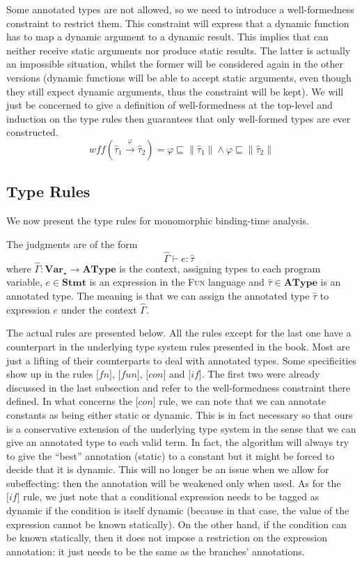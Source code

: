 \documentclass[a4wide,12pt]{article}
\theoremstyle{definition}
\theoremstyle{plain}
\theoremstyle{remark}
\def\Stmt {\mathbf{Stmt}}
\def\Var {\mathbf{Var}}
\def\AType{\mathbf{AType}}
\def\sqleq{\sqsubseteq}
\def\htau{\hat{\tau}}
\def\HGamma{\hat{\Gamma}}
\def\judge#1#2#3{#1 \vdash #2 : #3\;\;}
\def\annot#1{\|#1\|}
\begin{document}
Some annotated types are not allowed, so we need to introduce a well-formedness
constraint to restrict them. This constraint will express that a dynamic function
has to map a dynamic argument to a dynamic result. This implies that
can neither receive static arguments nor produce static results. The latter is actually
an impossible situation, whilst the former will be considered again in the other versions
(dynamic functions will be able to accept static arguments, even though they still expect dynamic arguments,
thus the constraint will be kept).
We will just be concerned to give a definition of well-formedness at the top-level and
induction on the type rules then guarantees that only
well-formed types are ever constructed.
\[
wff(\htau_1 \overset{\varphi}{\to} \htau_2) 
= \varphi \sqleq \annot{\htau_1}
 \land   \varphi \sqleq \annot{\htau_2}
\]

\subsection{Type Rules}

We now present the type rules for monomorphic binding-time analysis.

The judgments are of the form
\[\judge{\HGamma}{e}{\htau}\]
where $\HGamma: \Var_\star \to \AType$ is the context, assigning types to each program variable, 
$e \in \Stmt$ is an expression in the \textsc{Fun} language and $\htau \in \AType$ is an annotated type.
The meaning is that we can assign the annotated type $\htau$ to expression $e$ under the context $\HGamma$. 


The actual rules are presented below. All the rules except for the last one
have a counterpart in the underlying type system rules presented in the book.
Most are just a lifting of their counterparts to deal with annotated types.
Some specificities show up in the rules
$\lbrack fn \rbrack$,
$\lbrack fun \rbrack$,
$\lbrack con \rbrack$ and
$\lbrack if \rbrack$. 
The first two were already discussed in the last subsection and refer to 
the well-formedness constraint there defined.
In what concerns the $\lbrack con \rbrack$ rule, we can note that we can annotate constants 
as being either static or dynamic. This is in fact necessary so that ours
is a conservative extension of the underlying type system in the sense that 
we can give an annotated type to each valid term. In fact, the algorithm will always try to give the
``best'' annotation (static) to a constant but it might be forced to decide that it is dynamic. 
This will no longer be an issue when we allow for subeffecting: then the annotation will be weakened
only when used. As for the $\lbrack if \rbrack$ rule, we just note that a conditional expression
needs to be tagged as dynamic if the condition is itself dynamic (because in that case,
the value of the expression cannot be known statically). On the other hand, if the condition
can be known statically, then it does not impose a restriction on the expression annotation: it
just needs to be the same as the branches' annotations.
\end{document}
